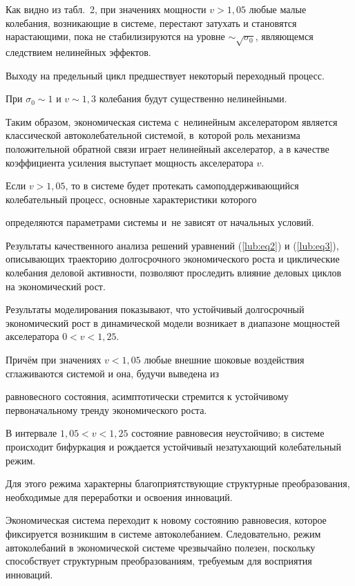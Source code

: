 Как видно из табл.~2, при значениях мощности $v >1,05$ любые малые  колебания, возникающие в системе, перестают затухать и становятся нарастающими, пока не стабилизируются на уровне $\sim  \sqrt {\sigma _0 } $, являющемся следствием нелинейных эффектов. 

Выходу на предельный цикл предшествует некоторый переходный процесс. 

При $\sigma _0 \sim 1$ и $v \sim 1,3$ колебания будут существенно нелинейными. 

Таким образом, экономическая система с~нелинейным акселератором является классической автоколебательной системой, в~которой роль механизма положительной обратной связи играет нелинейный акселератор, а в качестве коэффициента усиления выступает мощность акселератора $v .$ 

Если $v >1,05$, то в системе будет протекать самоподдерживающийся колебательный процесс, основные характеристики которого 

определяются параметрами системы и~не зависят от начальных условий.



Результаты качественного анализа решений уравнений (\ref{lub:eq2}) и (\ref{lub:eq3}), описывающих траекторию долгосрочного экономического роста и циклические колебания деловой активности, позволяют проследить влияние деловых циклов на экономический рост.



Результаты моделирования показывают, что устойчивый долгосрочный экономический рост в динамической модели возникает в диапазоне мощностей акселератора $0<v <1,25$. 

Причём при значениях $v <1,05$ любые внешние шоковые воздействия сглаживаются системой и она, будучи выведена из 

равновесного состояния, асимптотически стремится к устойчивому  первоначальному тренду экономического роста.



В интервале $1,05<v <1,25$ состояние равновесия неустойчиво; в системе происходит бифуркация и рождается устойчивый незатухающий колебательный  режим. 

Для этого режима характерны благоприятствующие структурные преобразования, необходимые для переработки и освоения инноваций. 

Экономическая система переходит к новому состоянию равновесия, которое  фиксируется возникшим в системе автоколебанием. Следовательно, режим автоколебаний в экономической системе чрезвычайно полезен, поскольку  способствует структурным преобразованиям, требуемым для восприятия инноваций.



